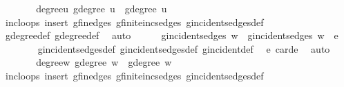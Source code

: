 \begin{isabellebody}
\ \ \ \ \isamarkupfalse%
\ \isamarkupfalse%
\ degree{\isacharunderscore}{\kern0pt}u{\isacharcolon}{\kern0pt}\ {\isachardoublequoteopen}g{\isacharprime}{\kern0pt}{\isachardot}{\kern0pt}degree\ u\ {\isacharequal}{\kern0pt}\ g{\isachardot}{\kern0pt}degree\ u\ {\isacharplus}{\kern0pt}\ {}{\isachardoublequoteclose}\isanewline
\ \ \ \ \ \ \isamarkupfalse%
\ inc{\isacharunderscore}{\kern0pt}loops\ insert{\isacharparenleft}{\kern0pt}{}{\isacharparenright}{\kern0pt}\ g{\isachardot}{\kern0pt}fin{\isacharunderscore}{\kern0pt}edges\ g{\isachardot}{\kern0pt}finite{\isacharunderscore}{\kern0pt}inc{\isacharunderscore}{\kern0pt}sedges\ g{\isachardot}{\kern0pt}incident{\isacharunderscore}{\kern0pt}sedges{\isacharunderscore}{\kern0pt}def\isanewline
\ \ \ \ \ \ \isamarkupfalse%
\ g{\isacharprime}{\kern0pt}{\isachardot}{\kern0pt}degree{\isacharunderscore}{\kern0pt}def\ g{\isachardot}{\kern0pt}degree{\isacharunderscore}{\kern0pt}def\ \isamarkupfalse%
\ auto\isanewline
\ \ \ \ \isamarkupfalse%
\ {\isachardoublequoteopen}g{\isacharprime}{\kern0pt}{\isachardot}{\kern0pt}incident{\isacharunderscore}{\kern0pt}sedges\ w\ {\isacharequal}{\kern0pt}\ g{\isachardot}{\kern0pt}incident{\isacharunderscore}{\kern0pt}sedges\ w\ {\isasymunion}\ {\isacharbraceleft}{\kern0pt}e{\isacharbraceright}{\kern0pt}{\isachardoublequoteclose}\isanewline
\ \ \ \ \ \ \isamarkupfalse%
\ g{\isacharprime}{\kern0pt}{\isachardot}{\kern0pt}incident{\isacharunderscore}{\kern0pt}sedges{\isacharunderscore}{\kern0pt}def\ g{\isachardot}{\kern0pt}incident{\isacharunderscore}{\kern0pt}sedges{\isacharunderscore}{\kern0pt}def\ g{\isachardot}{\kern0pt}incident{\isacharunderscore}{\kern0pt}def\ \isamarkupfalse%
\ e\ card{\isacharunderscore}{\kern0pt}e\ \isamarkupfalse%
\ auto\isanewline
\ \ \ \ \isamarkupfalse%
\ \isamarkupfalse%
\ degree{\isacharunderscore}{\kern0pt}w{\isacharcolon}{\kern0pt}\ {\isachardoublequoteopen}g{\isacharprime}{\kern0pt}{\isachardot}{\kern0pt}degree\ w\ {\isacharequal}{\kern0pt}\ g{\isachardot}{\kern0pt}degree\ w\ {\isacharplus}{\kern0pt}\ {}{\isachardoublequoteclose}\isanewline
\ \ \ \ \ \ \isamarkupfalse%
\ inc{\isacharunderscore}{\kern0pt}loops\ insert{\isacharparenleft}{\kern0pt}{}{\isacharparenright}{\kern0pt}\ g{\isachardot}{\kern0pt}fin{\isacharunderscore}{\kern0pt}edges\ g{\isachardot}{\kern0pt}finite{\isacharunderscore}{\kern0pt}inc{\isacharunderscore}{\kern0pt}sedges\ g{\isachardot}{\kern0pt}incident{\isacharunderscore}{\kern0pt}sedges{\isacharunderscore}{\kern0pt}def\isanewline

\end{isabellebody}
